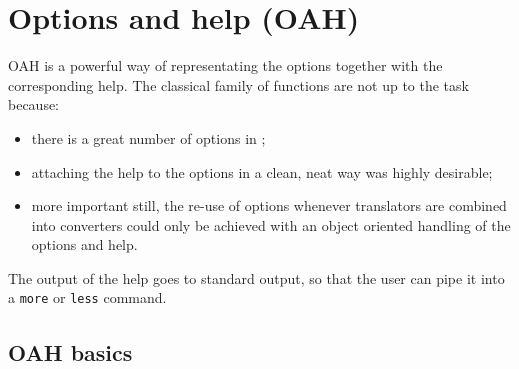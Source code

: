 
\chapter{Options and help (OAH)}


OAH is a powerful way of representating the options together with the corresponding help. The classical  family of functions are not up to the task because:
\begin{itemize}
\item there is a great number of options in \mf;
\item attaching the help to the options in a clean, neat way was highly desirable;
\item more important still, the re-use of options whenever translators are combined into converters could only be achieved with an object oriented handling of the options and help.
\end{itemize}

The output of the help  goes to standard output, so that the user can pipe it into a {\tt more} or {\tt less} command.


\section{OAH basics}


